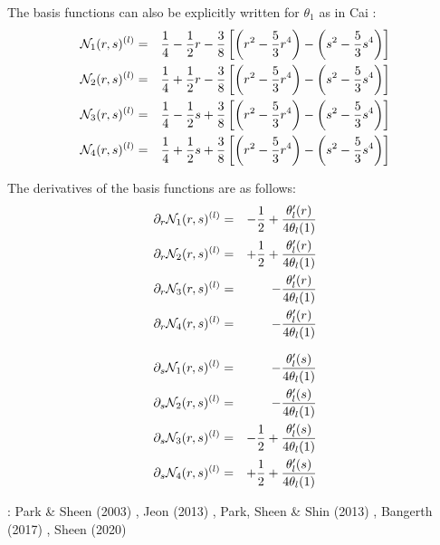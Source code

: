 The basis functions can also be explicitly written for $\theta_1$ as in Cai \etal \cite{cady99}:
\begin{eqnarray}
{\mathcal{N}}_1(r,s)^{(l)} 
&=& \frac{1}{4} - \frac{1}{2} r - \frac38 \left[\left( r^2-\frac53r^4 \right) - \left(s^2-\frac53s^4 \right) \right] \nonumber\\
{\mathcal{N}}_2(r,s)^{(l)} 
&=& \frac{1}{4} + \frac{1}{2} r - \frac38 \left[\left( r^2-\frac53r^4 \right) - \left(s^2-\frac53s^4 \right) \right] \nonumber\\
{\mathcal{N}}_3(r,s)^{(l)} 
&=& \frac{1}{4} - \frac{1}{2} s + \frac38 \left[\left( r^2-\frac53r^4 \right) - \left(s^2-\frac53s^4 \right) \right] \nonumber\\
{\mathcal{N}}_4(r,s)^{(l)} 
&=& \frac{1}{4} + \frac{1}{2} s + \frac38 \left[\left( r^2-\frac53r^4 \right) - \left(s^2-\frac53s^4 \right) \right] 
\end{eqnarray}

The derivatives of the basis functions are as follows:
\begin{eqnarray}
\partial_r {\mathcal{N}}_1(r,s)^{(l)} &=&  - \frac{1}{2}  + \frac{\theta_l'(r)}{4 \theta_l(1)}  \nonumber\\
\partial_r {\mathcal{N}}_2(r,s)^{(l)} &=&  + \frac{1}{2}  + \frac{\theta_l'(r)}{4 \theta_l(1)}  \nonumber\\
\partial_r {\mathcal{N}}_3(r,s)^{(l)} &=&  - \frac{\theta_l'(r)}{4 \theta_l(1)}  \nonumber\\
\partial_r {\mathcal{N}}_4(r,s)^{(l)} &=&  - \frac{\theta_l'(r)}{4 \theta_l(1)}  
\end{eqnarray}

\begin{eqnarray}
\partial_s {\mathcal{N}}_1(r,s)^{(l)} &=&   -\frac{\theta_l'(s)}{4 \theta_l(1)}  \nonumber\\
\partial_s {\mathcal{N}}_2(r,s)^{(l)} &=&   -\frac{\theta_l'(s)}{4 \theta_l(1)}  \nonumber\\
\partial_s {\mathcal{N}}_3(r,s)^{(l)} &=&   - \frac{1}{2} + \frac{\theta_l'(s)}{4 \theta_l(1)}  \nonumber\\
\partial_s {\mathcal{N}}_4(r,s)^{(l)} &=&   + \frac{1}{2} + \frac{\theta_l'(s)}{4 \theta_l(1)}  
\end{eqnarray}





\Literature: 
Park \& Sheen (2003) \cite{pash03},
Jeon \etal (2013) \cite{jens13},
Park, Sheen \& Shin (2013) \cite{pass13},
Bangerth \etal (2017) \cite{baks17},
Sheen (2020) \cite{shee20}
